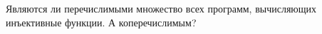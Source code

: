 Являются ли перечислимыми множество всех программ, вычисляющих инъективные функции. А коперечислимым?